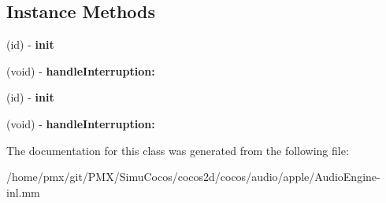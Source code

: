 \subsection*{Instance Methods}
\begin{DoxyCompactItemize}
\item 
\mbox{\label{interfaceAudioEngineSessionHandler_ab5001865b4494bd8c63fac3140f073aa}} 
(id) -\/ {\bfseries init}
\item 
\mbox{\label{interfaceAudioEngineSessionHandler_a115f1260d401d89306e5c27f7e16bf8c}} 
(void) -\/ {\bfseries handle\+Interruption\+:}
\item 
\mbox{\label{interfaceAudioEngineSessionHandler_ab5001865b4494bd8c63fac3140f073aa}} 
(id) -\/ {\bfseries init}
\item 
\mbox{\label{interfaceAudioEngineSessionHandler_a115f1260d401d89306e5c27f7e16bf8c}} 
(void) -\/ {\bfseries handle\+Interruption\+:}
\end{DoxyCompactItemize}


The documentation for this class was generated from the following file\+:\begin{DoxyCompactItemize}
\item 
/home/pmx/git/\+P\+M\+X/\+Simu\+Cocos/cocos2d/cocos/audio/apple/Audio\+Engine-\/inl.\+mm\end{DoxyCompactItemize}
